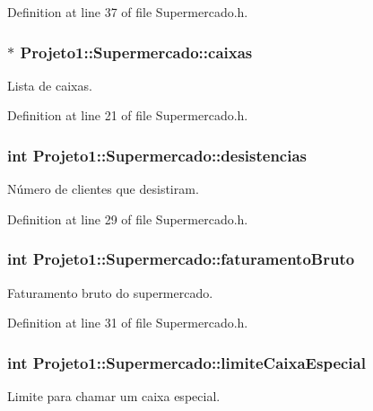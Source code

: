 Definition at line 37 of file Supermercado.h.

\hypertarget{classProjeto1_1_1Supermercado_a0377fe11973f887d33fc7c743dd499de}{
\subsubsection[{caixas}]{$\ast$ {\bf Projeto1::Supermercado::caixas}}}
\label{classProjeto1_1_1Supermercado_a0377fe11973f887d33fc7c743dd499de}
Lista de caixas. 

Definition at line 21 of file Supermercado.h.

\hypertarget{classProjeto1_1_1Supermercado_a258d2c48df71a1827f83e2658aa1e26d}{
\subsubsection[{desistencias}]{\setlength{\rightskip}{0pt plus 5cm}int {\bf Projeto1::Supermercado::desistencias}}}
\label{classProjeto1_1_1Supermercado_a258d2c48df71a1827f83e2658aa1e26d}
Número de clientes que desistiram. 

Definition at line 29 of file Supermercado.h.

\hypertarget{classProjeto1_1_1Supermercado_adcecd89e129cf0486b6ce02d162c4a55}{
\subsubsection[{faturamentoBruto}]{\setlength{\rightskip}{0pt plus 5cm}int {\bf Projeto1::Supermercado::faturamentoBruto}}}
\label{classProjeto1_1_1Supermercado_adcecd89e129cf0486b6ce02d162c4a55}
Faturamento bruto do supermercado. 

Definition at line 31 of file Supermercado.h.

\hypertarget{classProjeto1_1_1Supermercado_a11e5d386fe154d3e8ee3d8f7fa3d28a1}{
\subsubsection[{limiteCaixaEspecial}]{\setlength{\rightskip}{0pt plus 5cm}int {\bf Projeto1::Supermercado::limiteCaixaEspecial}}}
\label{classProjeto1_1_1Supermercado_a11e5d386fe154d3e8ee3d8f7fa3d28a1}
Limite para chamar um caixa especial. 

